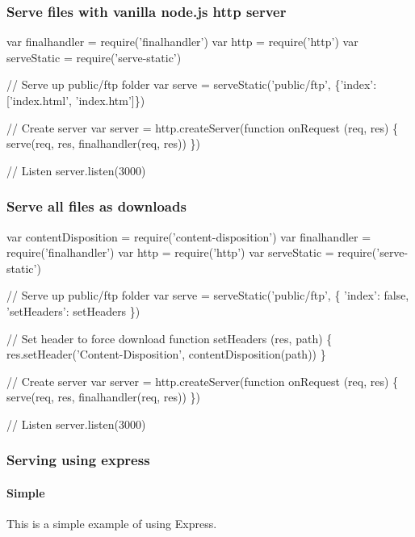 \subsubsection*{Serve files with vanilla node.\+js http server}


\begin{DoxyCode}
var finalhandler = require('finalhandler')
var http = require('http')
var serveStatic = require('serve-static')

// Serve up public/ftp folder
var serve = serveStatic('public/ftp', \{'index': ['index.html', 'index.htm']\})

// Create server
var server = http.createServer(function onRequest (req, res) \{
  serve(req, res, finalhandler(req, res))
\})

// Listen
server.listen(3000)
\end{DoxyCode}


\subsubsection*{Serve all files as downloads}


\begin{DoxyCode}
var contentDisposition = require('content-disposition')
var finalhandler = require('finalhandler')
var http = require('http')
var serveStatic = require('serve-static')

// Serve up public/ftp folder
var serve = serveStatic('public/ftp', \{
  'index': false,
  'setHeaders': setHeaders
\})

// Set header to force download
function setHeaders (res, path) \{
  res.setHeader('Content-Disposition', contentDisposition(path))
\}

// Create server
var server = http.createServer(function onRequest (req, res) \{
  serve(req, res, finalhandler(req, res))
\})

// Listen
server.listen(3000)
\end{DoxyCode}


\subsubsection*{Serving using express}

\paragraph*{Simple}

This is a simple example of using Express.


